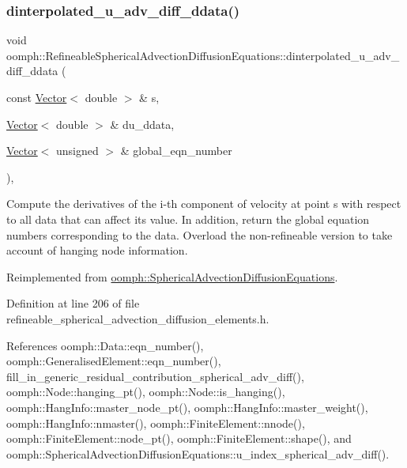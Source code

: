 \subsubsection{\texorpdfstring{dinterpolated\+\_\+u\+\_\+adv\+\_\+diff\+\_\+ddata()}{dinterpolated\_u\_adv\_diff\_ddata()}}
{\footnotesize\ttfamily void oomph\+::\+Refineable\+Spherical\+Advection\+Diffusion\+Equations\+::dinterpolated\+\_\+u\+\_\+adv\+\_\+diff\+\_\+ddata (\begin{DoxyParamCaption}\item[{const \hyperlink{classoomph_1_1Vector}{Vector}$<$ double $>$ \&}]{s,  }\item[{\hyperlink{classoomph_1_1Vector}{Vector}$<$ double $>$ \&}]{du\+\_\+ddata,  }\item[{\hyperlink{classoomph_1_1Vector}{Vector}$<$ unsigned $>$ \&}]{global\+\_\+eqn\+\_\+number }\end{DoxyParamCaption})\hspace{0.3cm}{\ttfamily [inline]}, {\ttfamily [virtual]}}



Compute the derivatives of the i-\/th component of velocity at point s with respect to all data that can affect its value. In addition, return the global equation numbers corresponding to the data. Overload the non-\/refineable version to take account of hanging node information. 



Reimplemented from \hyperlink{classoomph_1_1SphericalAdvectionDiffusionEquations_aec614fe14108871e1c47345b8cac97d7}{oomph\+::\+Spherical\+Advection\+Diffusion\+Equations}.



Definition at line 206 of file refineable\+\_\+spherical\+\_\+advection\+\_\+diffusion\+\_\+elements.\+h.



References oomph\+::\+Data\+::eqn\+\_\+number(), oomph\+::\+Generalised\+Element\+::eqn\+\_\+number(), fill\+\_\+in\+\_\+generic\+\_\+residual\+\_\+contribution\+\_\+spherical\+\_\+adv\+\_\+diff(), oomph\+::\+Node\+::hanging\+\_\+pt(), oomph\+::\+Node\+::is\+\_\+hanging(), oomph\+::\+Hang\+Info\+::master\+\_\+node\+\_\+pt(), oomph\+::\+Hang\+Info\+::master\+\_\+weight(), oomph\+::\+Hang\+Info\+::nmaster(), oomph\+::\+Finite\+Element\+::nnode(), oomph\+::\+Finite\+Element\+::node\+\_\+pt(), oomph\+::\+Finite\+Element\+::shape(), and oomph\+::\+Spherical\+Advection\+Diffusion\+Equations\+::u\+\_\+index\+\_\+spherical\+\_\+adv\+\_\+diff().

